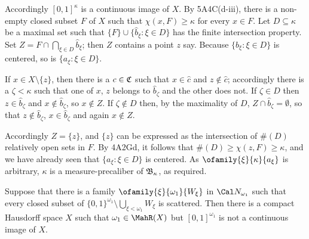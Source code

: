 {Accordingly $[0,1]^{\kappa}$ is a continuous image
of $X$.   By 5A4C(d-iii),
there is a non-empty closed subset $F$ of $X$ such
that $\chi(x,F)\ge\kappa$ for every $x\in F$.   Let $D\subseteq\kappa$
be a maximal set such that $\{F\}\cup\{\widehat{b}_{\xi}:\xi\in D\}$ has
the finite intersection property.   Set
$Z=F\cap\bigcap_{\xi\in D}\widehat{b}_{\xi}$;  then $Z$ contains a point
$z$ say.   Because $\{b_{\xi}:\xi\in D\}$ is centered, so is
$\{a_{\xi}:\xi\in D\}$.

If $x\in X\setminus\{z\}$, then there is a $c\in\frak C$ such that
$x\in\widehat{c}$ and $z\notin\widehat{c}$;  accordingly there is a
$\zeta<\kappa$ such that one of $x$, $z$ belongs to
$\widehat{b}_{\zeta}$ and the other does not.   If
$\zeta\in D$ then $z\in\widehat{b}_{\zeta}$ and
$x\notin\widehat{b}_{\zeta}$, so $x\notin Z$.   If $\zeta\notin D$ then,
by the maximality of $D$, $Z\cap\widehat{b}_{\zeta}=\emptyset$, so that
$z\notin\widehat{b}_{\zeta}$, $x\in\widehat{b}_{\zeta}$ and again
$x\notin Z$.

Accordingly $Z=\{z\}$, and $\{z\}$ can be expressed as the intersection of
$\#(D)$ relatively open sets in $F$.   By 4A2Gd, it follows that
$\#(D)\ge\chi(z,F)\ge\kappa$, and we have already seen that
$\{a_{\xi}:\xi\in D\}$ is centered.   As $\ofamily{\xi}{\kappa}{a_{\xi}}$
is arbitrary, $\kappa$ is a measure-precaliber of $\frak B_{\kappa}$, as
required.
}%

 Suppose that
there is a family $\ofamily{\xi}{\omega_1}{W_{\xi}}$ in
$\Cal N_{\omega_1}$ such that every closed subset of
$\{0,1\}^{\omega_1}\setminus\bigcup_{\xi<\omega_1}W_{\xi}$ is scattered.
Then there is a compact Hausdorff space $X$ such that
$\omega_1\in\MahR(X)$ but $[0,1]^{\omega_1}$ is not a continuous image
of $X$.

